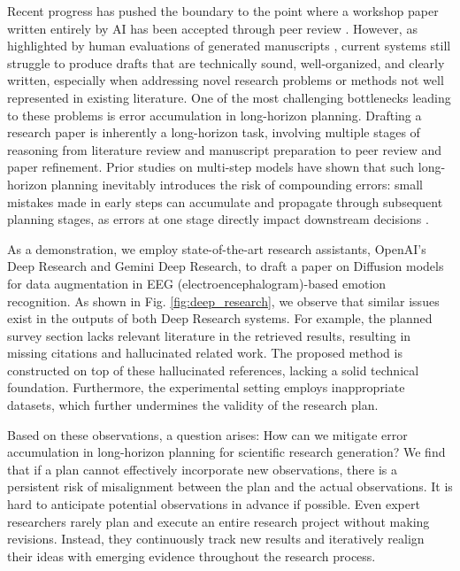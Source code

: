 \documentclass[manuscript,review,anonymous]{acmart}
\begin{document}
Recent progress has pushed the boundary to the point where a workshop paper written entirely by AI has been accepted through peer review \cite{yamada2025ai}. However, as highlighted by human evaluations of generated manuscripts \cite{yamada2025ai}, current systems still struggle to produce drafts that are technically sound, well-organized, and clearly written, especially when addressing novel research problems or methods not well represented in existing literature. One of the most challenging bottlenecks leading to these problems is error accumulation in long-horizon planning. Drafting a research paper is inherently a long-horizon task, involving multiple stages of reasoning from literature review and manuscript preparation to peer review and paper refinement. Prior studies on multi-step models have shown that such long-horizon planning inevitably introduces the risk of compounding errors: small mistakes made in early steps can accumulate and propagate through subsequent planning stages, as errors at one stage directly impact downstream decisions \cite{wang2025expressive, han2023expert, venkatraman2015improving, hejna2023improving}.

As a demonstration, we employ state-of-the-art research assistants, OpenAI's Deep Research \cite{openai2025gpt41} and Gemini Deep Research, to draft a paper on Diffusion models for data augmentation in EEG (electroencephalogram)-based emotion recognition. As shown in Fig. \ref{fig:deep_research}, we observe that similar issues exist in the outputs of both Deep Research systems. For example, the planned survey section lacks relevant literature in the retrieved results, resulting in missing citations and hallucinated related work. The proposed method is constructed on top of these hallucinated references, lacking a solid technical foundation. Furthermore, the experimental setting employs inappropriate datasets, which further undermines the validity of the research plan.

Based on these observations, a question arises: How can we mitigate error accumulation in long-horizon planning for scientific research generation? We find that if a plan cannot effectively incorporate new observations, there is a persistent risk of misalignment between the plan and the actual observations. It is hard to anticipate potential observations in advance if possible. Even expert researchers rarely plan and execute an entire research project without making revisions. Instead, they continuously track new results and iteratively realign their ideas with emerging evidence throughout the research process.
\end{document}
